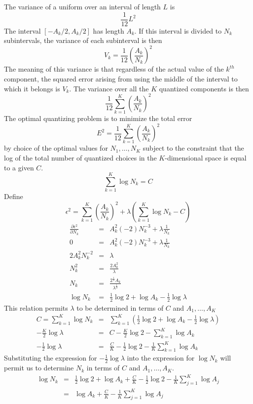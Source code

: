 {
The variance of a uniform over an interval of length $L$ is
$$
\frac{1}{12}L^2
$$
%
The interval $[-A_k/2,A_k/2]$ has length $A_k$. If this interval is divided to
$N_k$ subintervals, the variance of each subinterval is then
$$
V_k=\frac{1}{12}\left(\frac{A_k}{N_k}\right)^2
$$
%
The meaning of this variance is that regardless of the actual value of
the $k^{th}$ component, the squared error arising from using the middle of
the interval to which it belongs is $V_k$.
%
The variance over all the $K$ quantized components is then
%
$$
\frac{1}{12}\sum_{k=1}^K \left(\frac{A_k}{N_k}\right)^2
$$
%
The optimal quantizing problem is to minimize the total error
$$
E^2=\frac{1}{12}\sum_{k=1}^K \left(\frac{A_k}{N_k}\right)^2
$$
by choice of the optimal values for $N_1,\ldots,N_K$ subject to
the constraint that the log of the total number of quantized choices in
the $K$-dimensional space is equal to a given $C$.
$$
\sum_{k=1}^K \log N_k=C
$$
%
Define
$$
\epsilon^2=\sum_{k=1}^K \left(\frac{A_k}{N_k}\right)^2+\lambda\left(\sum_{k=1}^K \log N_k-C\right)
$$
%
\begin{eqnarray*}
\frac{\partial \epsilon^2}{\partial N_k}&=&A_k^2(-2)N_k^{-3}+\lambda\frac{1}{N_k}\\
0&=&A_k^2(-2)N_k^{-3}+\lambda\frac{1}{N_k}\\
2A_k^2 N_k^{-2}&=&\lambda\\
N_k^2&=&\frac{2A_k^2}{\lambda}\\
N_k&=&\frac{2^{\frac{1}{2}}A_k}{\lambda^{\frac{1}{2}}}\\
\log N_k&=&\frac{1}{2}\log 2+ \log A_k -\frac{1}{2}\log \lambda
\end{eqnarray*}
This relation permits $\lambda$ to be determined in terms of $C$ and $A_1,\ldots,A_K$\bigskip
\begin{eqnarray*}
C=\sum_{k=1}^K \log N_k&=& \sum_{k=1}^K\left( \frac{1}{2}\log 2+ \log A_k -\frac{1}{2}\log \lambda\right)\\
-\frac{K}{2}\log\lambda&=&C-\frac{K}{2}\log 2-\sum_{k=1}^K\log A_k\\
-\frac{1}{2}\log\lambda&=&\frac{C}{K}-\frac{1}{2}\log 2 -\frac{1}{K}\sum_{k=1}^K \log A_k
\end{eqnarray*}
Substituting the expression for $-\frac{1}{2}\log \lambda$ into the expression
for $\log N_k$ will permit us to determine $N_k$ in terms of $C$ and $A_1,\ldots,A_K$.
\begin{eqnarray*}
\log N_k&=&\frac{1}{2}\log 2+ \log A_k+\frac{C}{K}-\frac{1}{2}\log 2 -\frac{1}{K}\sum_{j=1}^K \log A_j\\
&=&\log A_k+\frac{C}{K}-\frac{1}{K}\sum_{j=1}^K \log A_j
\end{eqnarray*}
}

